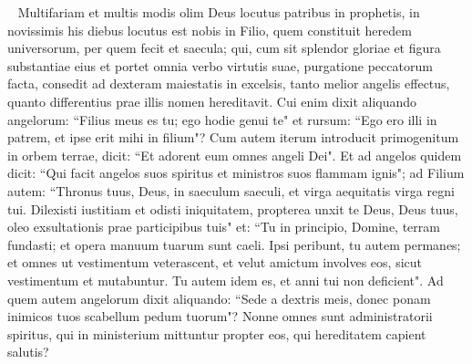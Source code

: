 
\begin{biblechapter}  
\verse Multifariam et multis modis olim Deus locutus patribus in prophetis, 
\verse in novissimis his diebus locutus est nobis in Filio, quem constituit heredem universorum, per quem fecit et saecula; 
\verse qui, cum sit splendor gloriae et figura substantiae eius et portet omnia verbo virtutis suae, purgatione peccatorum facta, consedit ad dexteram maiestatis in excelsis, 
\verse tanto melior angelis effectus, quanto differentius prae illis nomen hereditavit. 
\verse Cui enim dixit aliquando angelorum: “Filius meus es tu; ego hodie genui te" et rursum: “Ego ero illi in patrem, et ipse erit mihi in filium"? 
\verse Cum autem iterum introducit primogenitum in orbem terrae, dicit: “Et adorent eum omnes angeli Dei". 
\verse Et ad angelos quidem dicit: “Qui facit angelos suos spiritus et ministros suos flammam ignis"; 
\verse ad Filium autem: “Thronus tuus, Deus, in saeculum saeculi, et virga aequitatis virga regni tui. 
\verse Dilexisti iustitiam et odisti iniquitatem, propterea unxit te Deus, Deus tuus, oleo exsultationis prae participibus tuis" 
\verse et: “Tu in principio, Domine, terram fundasti; et opera manuum tuarum sunt caeli. 
\verse Ipsi peribunt, tu autem permanes; et omnes ut vestimentum veterascent, 
\verse et velut amictum involves eos, sicut vestimentum et mutabuntur. Tu autem idem es, et anni tui non deficient". 
\verse Ad quem autem angelorum dixit aliquando: “Sede a dextris meis, donec ponam inimicos tuos scabellum pedum tuorum"? 
\verse Nonne omnes sunt administratorii spiritus, qui in ministerium mittuntur propter eos, qui hereditatem capient salutis? 
\end{biblechapter}

